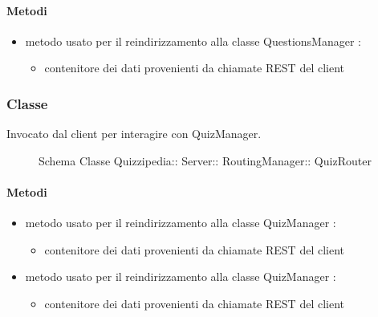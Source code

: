 \paragraph{Metodi}
\begin{itemize}
\item {}
\newline
metodo usato per il reindirizzamento alla classe QuestionsManager
\newline
{} :
\begin{itemize}
\item {}
\newline
contenitore dei dati provenienti da chiamate REST del client
\end{itemize}
\end{itemize}
\subsubsection{Classe }
Invocato dal client per interagire con QuizManager.
\begin{figure}[H]
\centering
\noindent{}
\caption[Schema Classe QuizRouter]{Schema Classe Quizzipedia:: Server:: RoutingManager:: QuizRouter}
\end{figure}
\paragraph{Metodi}
\begin{itemize}
\item {}
\newline
metodo usato per il reindirizzamento alla classe QuizManager
\newline
{} :
\begin{itemize}
\item {}
\newline
contenitore dei dati provenienti da chiamate REST del client
\end{itemize}
\item {}
\newline
metodo usato per il reindirizzamento alla classe QuizManager
\newline
{} :
\begin{itemize}
\item {}
\newline
contenitore dei dati provenienti da chiamate REST del client
\end{itemize}
\end{itemize}
